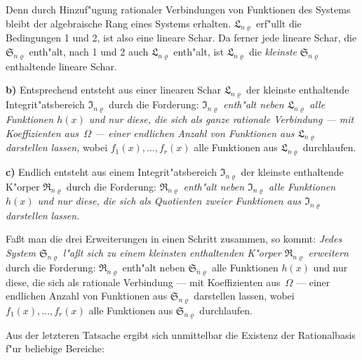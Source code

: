 \documentclass[11pt,a4paper]{article}
\begin{document}
Denn durch Hinzuf"{u}gung rationaler Verbindungen von Funktionen
des Systems bleibt der algebraische Rang eines Systems erhalten. $\mathfrak{L}_{n\varrho}$
erf"{u}llt die Bedingungen 1 und 2, ist also eine lineare Schar. Da ferner
jede lineare Schar, die $\mathfrak{S}_{n\varrho}$ enth"{a}lt, nach 1 und 2 auch $\mathfrak{L}_{n\varrho}$ enth"{a}lt,
ist $\mathfrak{L}_{n\varrho}$ die \emph{kleinste} $\mathfrak{S}_{n\varrho}$ enthaltende lineare Schar.

\smallskip
\noindent\textbf{b)} Entsprechend entsteht aus einer linearen Schar $\mathfrak{L}_{n\varrho}$ der kleinste
enthaltende Integrit"{a}tsbereich $\mathfrak{I}_{n\varrho}$ durch die Forderung:
\emph{$\mathfrak{I}_{n\varrho}$ enth"{a}lt neben $\mathfrak{L}_{n\varrho}$ alle Funktionen $h(x)$ und nur diese, die sich als
ganze rationale Verbindung --- mit Koeffizienten aus~$\Omega$ --- einer endlichen
Anzahl von Funktionen aus $\mathfrak{L}_{n\varrho}$ darstellen lassen,}
wobei $f_{1}(x),\dots,f_{r}(x)$ alle Funktionen aus $\mathfrak{L}_{n\varrho}$ durchlaufen.

\smallskip
\noindent\textbf{c)} Endlich entsteht aus einem Integrit"{a}tsbereich $\mathfrak{I}_{n\varrho}$ der kleinste enthaltende
K"{o}rper $\mathfrak{R}_{n\varrho}$ durch die Forderung:
\emph{$\mathfrak{R}_{n\varrho}$ enth"{a}lt neben $\mathfrak{I}_{n\varrho}$ alle Funktionen $h(x)$ und nur diese, die sich als
Quotienten zweier Funktionen aus $\mathfrak{I}_{n\varrho}$ darstellen lassen.}

Fa\ss{}t man die drei Erweiterungen in einen Schritt zusammen, so
kommt: \emph{Jedes System $\mathfrak{S}_{n\varrho}$ l"{a}\ss{}t sich zu einem kleinsten enthaltenden K"{o}rper
$\mathfrak{R}_{n\varrho}$ erweitern} durch die Forderung:
$\mathfrak{R}_{n\varrho}$ enth"{a}lt neben $\mathfrak{S}_{n\varrho}$ alle Funktionen $h(x)$ und nur diese, die sich als
rationale Verbindung --- mit Koeffizienten aus~$\Omega$ --- einer endlichen Anzahl
von Funktionen aus $\mathfrak{S}_{n\varrho}$ darstellen lassen, wobei $f_{1}(x),\dots,f_{r}(x)$ alle Funktionen
aus $\mathfrak{S}_{n\varrho}$ durchlaufen.

Aus der letzteren Tatsache ergibt sich unmittelbar die Existenz der
Rationalbasis f"{u}r beliebige Bereiche:
\end{document}
